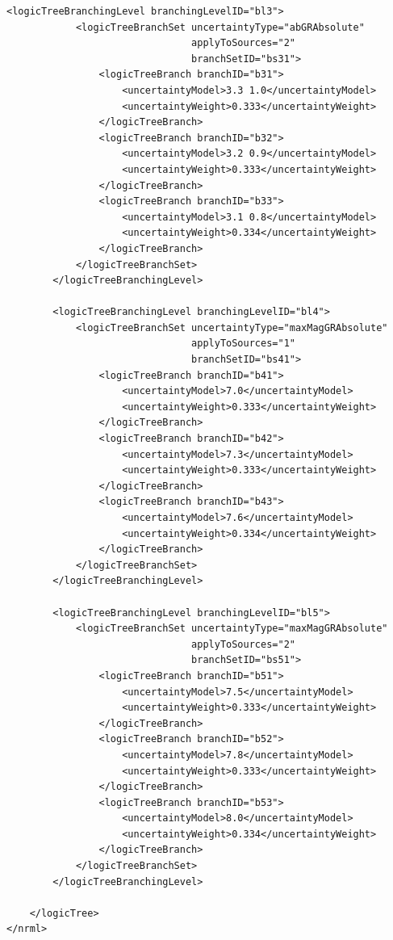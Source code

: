 \begin{Verbatim}[frame=single, commandchars=\\\{\}, fontsize=\normalsize]
        <logicTreeBranchingLevel branchingLevelID="bl3">
            <logicTreeBranchSet uncertaintyType="abGRAbsolute"
                                applyToSources="2"
                                branchSetID="bs31">
                <logicTreeBranch branchID="b31">
                    <uncertaintyModel>3.3 1.0</uncertaintyModel>
                    <uncertaintyWeight>0.333</uncertaintyWeight>
                </logicTreeBranch>
                <logicTreeBranch branchID="b32">
                    <uncertaintyModel>3.2 0.9</uncertaintyModel>
                    <uncertaintyWeight>0.333</uncertaintyWeight>
                </logicTreeBranch>
                <logicTreeBranch branchID="b33">
                    <uncertaintyModel>3.1 0.8</uncertaintyModel>
                    <uncertaintyWeight>0.334</uncertaintyWeight>
                </logicTreeBranch>
            </logicTreeBranchSet>
        </logicTreeBranchingLevel>

        <logicTreeBranchingLevel branchingLevelID="bl4">
            <logicTreeBranchSet uncertaintyType="maxMagGRAbsolute"
                                applyToSources="1"
                                branchSetID="bs41">
                <logicTreeBranch branchID="b41">
                    <uncertaintyModel>7.0</uncertaintyModel>
                    <uncertaintyWeight>0.333</uncertaintyWeight>
                </logicTreeBranch>
                <logicTreeBranch branchID="b42">
                    <uncertaintyModel>7.3</uncertaintyModel>
                    <uncertaintyWeight>0.333</uncertaintyWeight>
                </logicTreeBranch>
                <logicTreeBranch branchID="b43">
                    <uncertaintyModel>7.6</uncertaintyModel>
                    <uncertaintyWeight>0.334</uncertaintyWeight>
                </logicTreeBranch>
            </logicTreeBranchSet>
        </logicTreeBranchingLevel>

        <logicTreeBranchingLevel branchingLevelID="bl5">
            <logicTreeBranchSet uncertaintyType="maxMagGRAbsolute"
                                applyToSources="2"
                                branchSetID="bs51">
                <logicTreeBranch branchID="b51">
                    <uncertaintyModel>7.5</uncertaintyModel>
                    <uncertaintyWeight>0.333</uncertaintyWeight>
                </logicTreeBranch>
                <logicTreeBranch branchID="b52">
                    <uncertaintyModel>7.8</uncertaintyModel>
                    <uncertaintyWeight>0.333</uncertaintyWeight>
                </logicTreeBranch>
                <logicTreeBranch branchID="b53">
                    <uncertaintyModel>8.0</uncertaintyModel>
                    <uncertaintyWeight>0.334</uncertaintyWeight>
                </logicTreeBranch>
            </logicTreeBranchSet>
        </logicTreeBranchingLevel>

    </logicTree>
</nrml>
\end{Verbatim}

